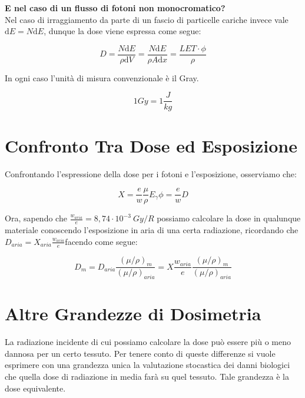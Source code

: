 \textbf{E nel caso di un flusso di fotoni non monocromatico?}\\

Nel caso di irraggiamento da parte di un fascio di particelle cariche invece vale $\mathrm{d}E=N\mathrm{d}E$, dunque la dose viene espressa come segue:

\begin{equation}
D=\frac{N\mathrm{d}E}{\rho \mathrm{d}V}=\frac{N\mathrm{d}E}{\rho A \mathrm{d}x}=\frac{LET\cdot\phi}{\rho}
\end{equation}

In ogni caso l'unità di misura convenzionale è il Gray.

\begin{equation}
1 Gy = 1 \frac{J}{kg}
\end{equation}

\section{Confronto Tra Dose ed Esposizione}

Confrontando l'espressione della dose per i fotoni e l'esposizione, osserviamo che:

\begin{equation}
X=\frac{e}{w}\frac{\mu}{\rho}E_{\gamma}\phi=\frac{e}{w}D
\end{equation}

Ora, sapendo che $\frac{w_{aria}}{e}=8,74\cdot 10^{-3} \ Gy/R$ possiamo calcolare la dose in qualunque materiale conoscendo l'esposizione in aria di una certa radiazione, ricordando che $D_{aria}=X_{aria}\frac{w_{aria}}{e}$facendo come segue:

\begin{equation}
D_{m}=D_{aria}\frac{(\mu/\rho)_m}{(\mu/\rho)_{aria}}=X\frac{w_{aria}}{e}\frac{(\mu/\rho)_m}{(\mu/\rho)_{aria}}
\end{equation}



\section{Altre Grandezze di Dosimetria}

La radiazione incidente di cui possiamo calcolare la dose può essere più o meno dannosa per un certo tessuto. Per tenere conto di queste differenze si vuole esprimere con una grandezza unica la valutazione stocastica dei danni biologici che quella dose di radiazione in media farà su quel tessuto. Tale grandezza è la dose equivalente.

